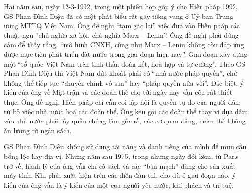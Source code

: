 Hai năm sau, ngày 12-3-1992, trong một phiên họp góp ý cho Hiến pháp 1992, GS Phan Đình Diệu đã có một phát biểu rất gây tiếng vang ở Uỷ ban Trung ương MTTQ Việt Nam. Ông đề nghị “tạm gác lại” việc đưa vào Hiến pháp các thuật ngữ “chủ nghĩa xã hội, chủ nghĩa Marx – Lenin”. Ông đề nghị phải dũng cảm để thấy rằng, “mô hình CNXH, cũng như Marx – Lenin không còn đáp ứng được mục tiêu phát triển đất nước trong giai đoạn hiện nay”. Giai đoạn xây dựng một “tổ quốc Việt Nam trên tinh thần đoàn kết, hoà hợp và tự cường”.
Theo GS Phan Đình Diệu thì Việt Nam dứt khoát phải có “nhà nước pháp quyền”, chứ không thể tiếp tục “chuyên chính vô sản” hay “pháp quyền nửa vời”. Đặc biệt, ý kiến của ông về Mặt trận và các đoàn thể cho tới ngày nay vẫn còn rất thiết thực. Ông đề nghị, Hiến pháp chỉ cần coi lập hội là quyền tự do của người dân; từ bỏ việc nhà nước hoá các đoàn thể. Ông kêu gọi các đoàn thể thay vì dựa dẫm vào nhà nước phải lấy quần chúng làm gốc rễ, các cơ quan đảng, đoàn thể không ăn lương từ ngân sách.

GS Phan Đình Diệu không sử dụng tài năng và danh tiếng của mình để mưu cầu bổng lộc hay địa vị. Những năm sau 1975, trong những ngày đói kém, từ Paris trở về, hành lý của ông vẫn chỉ có sách và các “bản mạch” dùng cho sản xuất máy tính. Khi phải xuất hiện trên các diễn đàn thì, cho dù ở giai đoạn nào, ý kiến của ông vẫn là ý kiến của một con người yêu nước, khí phách và trí tuệ.
